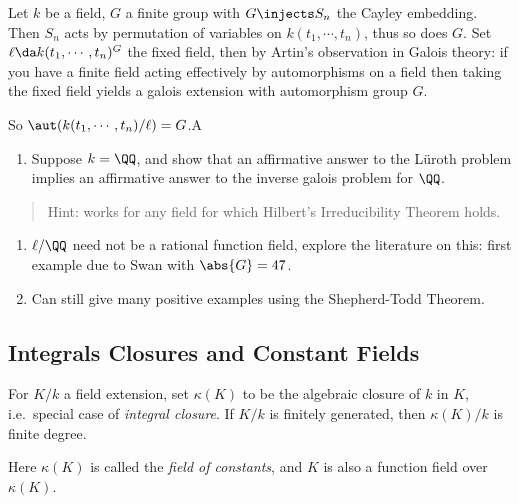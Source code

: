 \begin{exercise}

Let \(k\) be a field, \(G\) a finite group with \(G\injects S_n\) the
Cayley embedding. Then \(S_n\) acts by permutation of variables on
\(k(t_1, \cdots, t_n)\), thus so does \(G\). Set
\(\ell \da k(t_1, \cdots, t_n)^G\) the fixed field, then by Artin's
observation in Galois theory: if you have a finite field acting
effectively by automorphisms on a field then taking the fixed field
yields a galois extension with automorphism group \(G\).

So \(\aut(k(t_1, \cdots, t_n)/ \ell) = G\).A

\begin{enumerate}
\def\labelenumi{\alph{enumi}.}
\tightlist
\item
  Suppose \(k=\QQ\), and show that an affirmative answer to the Lüroth
  problem implies an affirmative answer to the inverse galois problem
  for \(\QQ\).
\end{enumerate}

\begin{quote}
Hint: works for any field for which Hilbert's Irreducibility Theorem
holds.
\end{quote}

\begin{enumerate}
\def\labelenumi{\alph{enumi}.}
\setcounter{enumi}{1}
\item
  \(\ell /\QQ\) need not be a rational function field, explore the
  literature on this: first example due to Swan with \(\abs{G} = 47\).
\item
  Can still give many positive examples using the Shepherd-Todd Theorem.
\end{enumerate}

\end{exercise}


\hypertarget{integrals-closures-and-constant-fields}{%
\subsection{Integrals Closures and Constant
Fields}\label{integrals-closures-and-constant-fields}}

\begin{definition}

For \(K/k\) a field extension, set \(\kappa(K)\) to be the algebraic
closure of \(k\) in \(K\), i.e.~special case of \emph{integral closure}.
If \(K/k\) is finitely generated, then \(\kappa(K)/k\) is finite degree.

Here \(\kappa(K)\) is called the \emph{field of constants}, and \(K\) is
also a function field over \(\kappa(K)\).

\end{definition}

